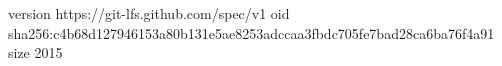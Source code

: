 version https://git-lfs.github.com/spec/v1
oid sha256:c4b68d127946153a80b131e5ae8253adccaa3fbdc705fe7bad28ca6ba76f4a91
size 2015
